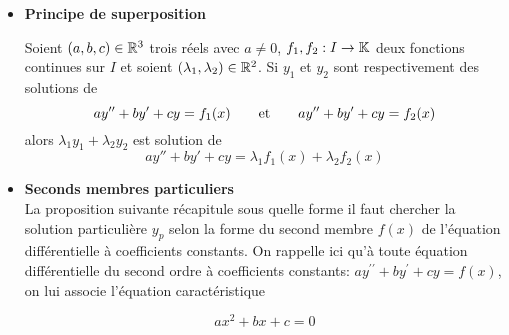 \documentclass[a4paper, 11pt]{article}
\begin{document}
\begin{itemize}
\item[\Large{\ding{182}}] \textbf{\large{Principe de superposition}}\\

 {\noindent  

\begin{prop}
Soient $(a,b,c)\in\mathbb{R}^3$ trois r\'eels avec $a\not= 0$, $f_1, f_2: I\rightarrow \mathbb{K}$ deux fonctions continues sur $I$ et soient $(\lambda_1,\lambda_2)\in\mathbb{R}^2$. Si $y_1$ et $y_2$ sont respectivement des solutions de 
$$ay^{\prime\prime}+by^{\prime}+cy=f_1(x)\qquad \hbox{et}\qquad ay^{\prime\prime}+by^{\prime}+cy=f_2(x)$$
alors $\lambda_1y_1+\lambda_2y_2$ est solution de $$ay''+by'+cy = \lambda_1f_1(x)+\lambda_2f_2(x)$$
\end{prop}
 
}\vsec

\item[\Large{\ding{183}}] \textbf{\large{Seconds membres particuliers}}\\

\noindent La proposition suivante r\'ecapitule sous quelle forme il faut chercher la solution particuli\`ere $y_p$ selon la forme du second membre $f(x)$ de l'\'equation diff\'erentielle \`a coefficients constants. On rappelle ici qu'\`a toute \'equation diff\'erentielle du second ordre \`a coefficients constants: $ay^{\prime\prime}+by^{\prime}+cy=f(x)$, on lui associe l'\'equation caract\'eristique 

\begin{equation}\label{eq caractéristique}\tag{EC}
ax^2+bx+c=0
\end{equation}



\end{itemize}
\end{document}
